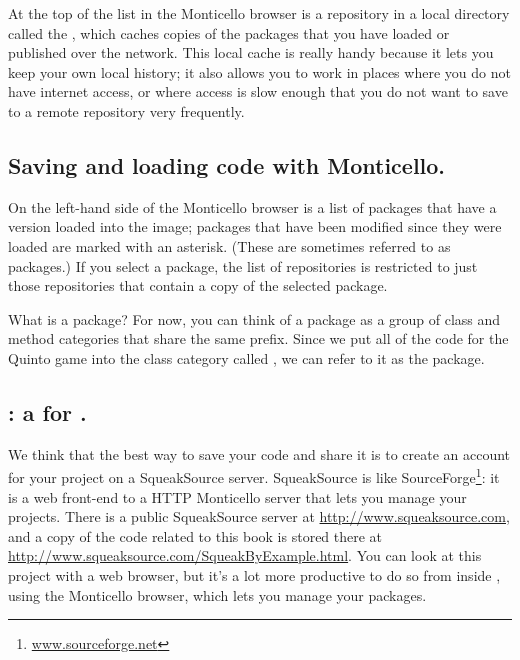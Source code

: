 \documentclass[a4paper,10pt,twoside]{book}
\begin{document}
At the top of the list in the Monticello browser is a repository in a local directory called the , which caches copies of the packages that you have loaded or published over the network. This local cache is really handy because it lets you keep your own local history; it also allows you to work in places where you do not have internet access, or where access is slow enough that you do not want to save to a remote repository very frequently.


\subsection{Saving and loading code with Monticello.}
On the left-hand side of the Monticello browser is a list of packages that have a version loaded into the image; packages that have been modified since they were loaded are marked with an asterisk.  (These are sometimes referred to as  packages.)  If you select a package, the list of repositories is restricted to just those repositories that contain a copy of the selected package.

What is a package?  For now, you can think of a package as a group of  class and method categories that share the same prefix.  Since we put all of the code for the Quinto game into the class category called , we can refer to it as the  package.


\subsection{: a  for \squeak.} 
We think that the best way to save your code and share it is to create an account for your project on a SqueakSource server. 
SqueakSource is like SourceForge\footnote{\url{www.sourceforge.net}}: it is a web front-end to a HTTP Monticello server that lets you manage your projects.
There is a public SqueakSource server at \url{http://www.squeaksource.com}, and a copy of the code related to this book is stored there at \url{http://www.squeaksource.com/SqueakByExample.html}. You can look at this project with a web browser, but it's a lot more productive to do so from inside \squeak, using the Monticello browser, which lets you manage your packages.
\end{document}
